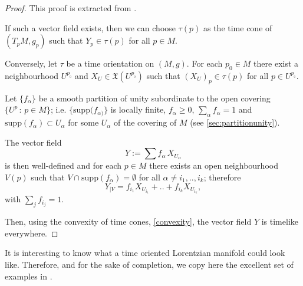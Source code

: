 \begin{proof}
	This proof is extracted from \cite[p. 201]{romero10}.

	If such a vector field exists, then we can choose $\tau(p)$ as the time cone of $(T_pM,g_p)$ such that $Y_p\in \tau(p)$ for all $p\in M$.
	
	Conversely, let $\tau$ be a time orientation on $(M,g)$. For each $p_0 \in M$ there exist a neighbourhood $U^{p_{_0}}$ and $X_U\in \mathfrak{X}(U^{p_{_0}})$ such that $(X_U)_p \in \tau(p)$ for all $p\in U^{p_{_0}}$.
	
	Let $\{f_{\alpha}\}$ be a smooth partition of unity subordinate to the open covering $\{U^p\, : \, p\in M\}$; i.e. $\{\mathrm{supp}(f_{\alpha)}\}$ is locally finite, $f_{\alpha}\geq 0$, $\sum_{\alpha} f_{\alpha}=1$ and $\mathrm{supp}(f_{\alpha}) \subset U_{\alpha}$ for some $U_{\alpha}$ of the covering of $M$ (see \autoref{sec:partitionunity}).
	
	The vector field 
	\[
		Y:=\sum f_{\alpha}\, X_{U_{\alpha}}
	\] 
	is then well-defined and for each $p\in M$ there exists an open neighbourhood $V(p)$ such that $V \cap \mathrm{supp}(f_{\alpha}) = \emptyset$ for all $\alpha \neq i_1,..,i_k$; therefore
	\[
		Y_{\mid V}=f_{i_1}X_{U_{i_1}}+..+f_{i_k}X_{U_{i_k}},
	\]
	with $\sum_j f_{i_j}=1$.
	
	Then, using the convexity of time cones, \autoref{convexity}, the vector field $Y$ is timelike everywhere.
\end{proof}

It is interesting to know what a time oriented Lorentzian manifold could look like. Therefore, and for the sake of completion, we copy here the excellent set of examples in \cite[Example 3.2]{romero10}.

